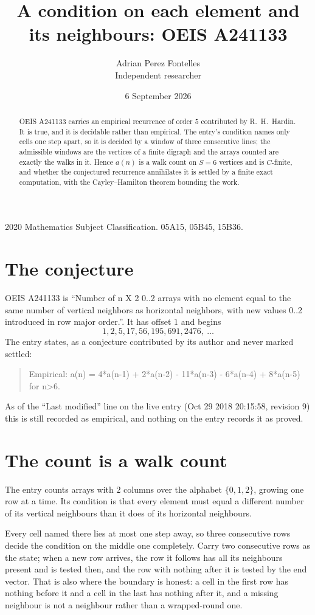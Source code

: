 \documentclass[11pt,a4paper]{article}
\title{A condition on each element and its neighbours: OEIS A241133}
\author{Adrian Perez Fontelles\\ \small Independent researcher}
\date{6 September 2026}
\theoremstyle{plain}
\theoremstyle{definition}
\begin{document}
\maketitle

\begin{abstract}
OEIS A241133 carries an empirical recurrence of order $5$ contributed by R.~H.~Hardin. It is
true, and it is decidable rather than empirical. The entry's condition names only cells one step apart, so it is decided by a window of
three consecutive lines; the
admissible windows are the vertices of a finite digraph and the arrays counted are exactly the
walks in it. Hence $a(n)$ is a walk count on $S=6$ vertices and is $C$-finite, and whether the
conjectured recurrence annihilates it is settled by a finite exact computation, with the
Cayley--Hamilton theorem bounding the work.
\end{abstract}

\noindent\small 2020 Mathematics Subject Classification. 05A15, 05B45, 15B36.\normalsize

\section{The conjecture}

OEIS A241133 is ``Number of n X 2 0..2 arrays with no element equal to the same number of vertical neighbors as horizontal neighbors, with new values 0..2 introduced in row major order.''. It has offset $1$ and begins
\[
1, 2, 5, 17, 56, 195, 691, 2476,\ \dots
\]
The entry states, as a conjecture contributed by its author and never marked settled:
\begin{quote}
Empirical: a(n) = 4*a(n-1) + 2*a(n-2) - 11*a(n-3) - 6*a(n-4) + 8*a(n-5) for n>6.
\end{quote}
As of the ``Last modified'' line on the live entry (Oct 29 2018 20:15:58, revision 9) this is still
recorded as empirical, and nothing on the entry records it as proved.

\section{The count is a walk count}

The entry counts arrays with $2$ columns over the alphabet $\{0,1,2\}$, growing one row at a time. Its condition is that every element must equal a different number of its vertical neighbours than it does of its horizontal neighbours.

Every cell named there lies at most one step away, so three consecutive rows decide the condition on the middle one completely. Carry two consecutive rows as the state; when a new row arrives, the row it follows has all its neighbours present and is tested then, and the row with nothing after it is tested by the end vector. That is also where the boundary is honest: a cell in the first row has nothing before it and a cell in the last has nothing after it, and a missing neighbour is not a neighbour rather than a wrapped-round one.
\end{document}
